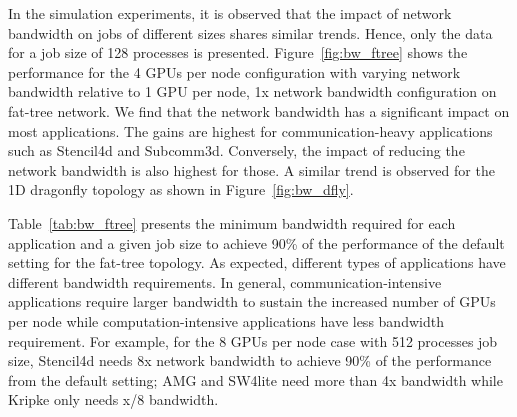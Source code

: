 In the simulation experiments, it is observed that the impact of network bandwidth on jobs of different sizes
shares similar trends. Hence, only the data for a job size of 128 processes is presented.
Figure~\ref{fig:bw_ftree} shows the performance for the 4 GPUs per node
configuration with varying network bandwidth relative to 1 GPU per node, 1x
network bandwidth configuration on fat-tree network. We find that the network
bandwidth has a significant impact on most applications.  The gains are  highest
for communication-heavy applications such as Stencil4d and Subcomm3d.
Conversely, the impact of reducing the network bandwidth is also highest for
those.  A similar trend is observed for the 1D dragonfly topology as
shown in Figure~\ref{fig:bw_dfly}.

Table~\ref{tab:bw_ftree} presents the minimum bandwidth required for each
application and a given job size to achieve 90\% of the performance of the
default setting for the fat-tree topology.  As expected, different types of
applications have different bandwidth requirements. In general,
communication-intensive applications require larger bandwidth to sustain the
increased number of GPUs per node while computation-intensive applications have
less bandwidth requirement. For example, for the 8 GPUs per node case with 512 processes
job size, Stencil4d needs 8x network bandwidth
to achieve 90\% of the performance from the default setting; AMG and SW4lite need more than 
4x bandwidth while
Kripke only needs x/8 bandwidth. 

\begin{table}[t]
  \centering
  \caption{Minimum bandwidth required to achieve 90\% of the performance of the
  default 1 GPU/node configuration for fat-tree}
    \label{tab:bw_ftree}
    \vspace{-1em}
\end{table}

